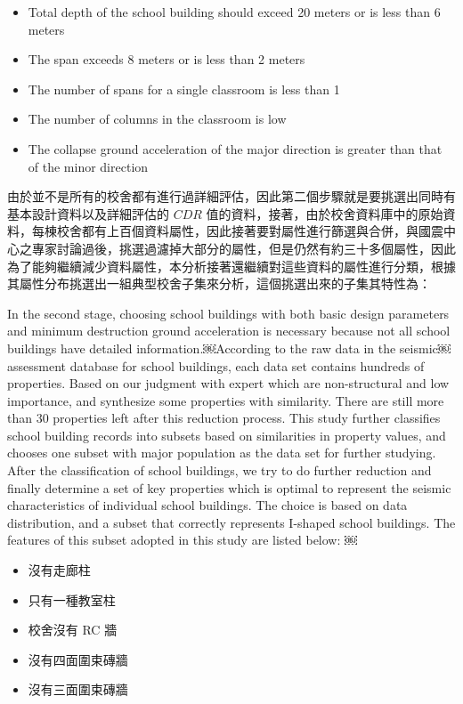 \begin{itemize}
\item Total depth of the school building should exceed 20 meters or is less than 6 meters
\item The span exceeds 8 meters or is less than 2 meters
\item The number of spans for a single classroom is less than 1
\item The number of columns in the classroom is low
\item The collapse ground acceleration of the major direction is greater than that of the minor direction
\end{itemize}

由於並不是所有的校舍都有進行過詳細評估，因此第二個步驟就是要挑選出同時有基本設計資料以及詳細評估的 $CDR$ 值的資料，接著，由於校舍資料庫中的原始資料，每棟校舍都有上百個資料屬性，因此接著要對屬性進行篩選與合併，與國震中心之專家討論過後，挑選過濾掉大部分的屬性，但是仍然有約三十多個屬性，因此為了能夠繼續減少資料屬性，本分析接著還繼續對這些資料的屬性進行分類，根據其屬性分布挑選出一組典型校舍子集來分析，這個挑選出來的子集其特性為：

In the second stage, choosing school buildings with both basic design parameters and minimum destruction ground acceleration is necessary because not all school buildings have detailed information.￼According to the raw data in the seismic￼assessment database for school buildings, each data set contains hundreds of properties. Based on our judgment with expert which are non-structural and low importance, and synthesize some properties with similarity. There are still more than 30 properties left after this reduction process. This study further classifies school building records into subsets based on similarities in property values, and chooses one subset with major population as the data set for further studying. After the classification of school buildings, we try to do further reduction and finally determine a set of key properties which is optimal to represent the seismic characteristics of individual school buildings. The choice is based on data distribution, and a subset that correctly represents I-shaped school buildings. The features of this subset adopted in this study are listed below:
￼
\begin{itemize}
\item 沒有走廊柱
\item 只有一種教室柱
\item 校舍沒有 RC 牆
\item 沒有四面圍束磚牆
\item 沒有三面圍束磚牆
\end{itemize}

